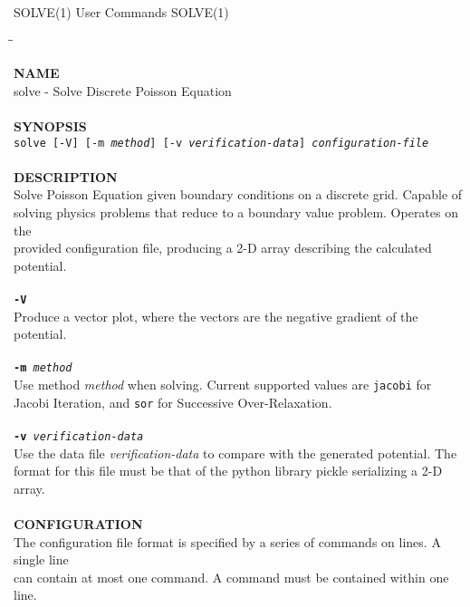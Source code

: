 \begin{flushleft}
	SOLVE(1)
	\hfill User Commands \hfill
	SOLVE(1)
\end{flushleft}

\begin{tabbing}
\hspace{30pt}\=\hspace{30pt}\=\kill

\textbf{NAME}\\
\> solve - Solve Discrete Poisson Equation\\
\\
\textbf{SYNOPSIS}\\
	\> \texttt{solve [-V] [-m \textit{method}] [-v \textit{verification-data}] \textit{configuration-file}}\\
	\\
\textbf{DESCRIPTION}\\
\> Solve Poisson Equation given boundary conditions on a discrete grid. Capable of\\
\> solving physics problems that reduce to a boundary value problem. Operates on the\\
\> provided configuration file, producing a 2-D array describing the calculated potential.\\
\\
\> \texttt{\textbf{-V}} \\
\> \> Produce a vector plot, where the vectors are the negative gradient of the potential.\\
\\
	\> \texttt{\textbf{-m} \textit{method}} \\
	\> \> Use method \textit{method} when solving. Current supported values are \texttt{jacobi} for\\
	\> \> Jacobi Iteration, and \texttt{sor} for Successive Over-Relaxation.\\
\\
	\> \texttt{\textbf{-v} \textit{verification-data}} \\
	\> \> Use the data file \textit{verification-data} to compare with the generated potential. The \\
	\> \> format for this file must be that of the python library pickle serializing a 2-D array.\\
\\
\textbf{CONFIGURATION}\\
\> The configuration file format is specified by a series of commands on lines. A single line\\
\> can contain at most one command. A command must be contained within one line.\\

\end{tabbing}
